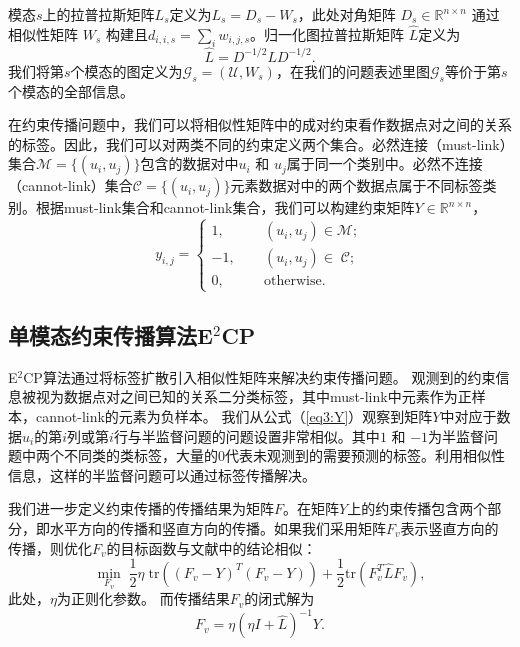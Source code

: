 模态$s$上的拉普拉斯矩阵$ {L}_s $定义为$ {L}_s={D}_s-{W}_s $，此处对角矩阵
$ {D}_s \in \mathbb{R}^{n\times n}$ 通过相似性矩阵 $ {W}_s$ 构建且$ d_{i,i,s} =\sum_i w_{i,j,s}$\cite{chung1997spectral}。归一化图拉普拉斯矩阵 $ \hat{{L}} $定义为
\begin{equation}
	\hat{{L}} = {D}^{-1/2}{LD}^{-1/2}.
\end{equation}
我们将第$s$个模态的图定义为$\mathcal{G}_s = (\mathcal{U},{W}_s)$，在我们的问题表述里图$\mathcal{G}_s$等价于第$s$个模态的全部信息。

在约束传播问题中，我们可以将相似性矩阵中的成对约束看作数据点对之间的关系的标签。因此，我们可以对两类不同的约束定义两个集合。必然连接（must-link）集合$ \mathcal{M} = \{(u_i,u_j)\} $包含的数据对中$ u_i $ 和 $ u_j $属于同一个类别中。必然不连接（cannot-link）集合$ \mathcal{C} = \{(u_i,u_j)\}$元素数据对中的两个数据点属于不同标签类别。根据must-link集合和cannot-link集合，我们可以构建约束矩阵$ {Y} \in  \mathbb{R}^{n\times n}$，
\begin{equation}
y_{i,j} = 
\begin{cases}
1, \qquad&(u_i,u_j)\in \mathcal{M};\\
-1, &(u_i,u_j)\in\; \mathcal{C};\\
0, &\text{otherwise}.
\end{cases}
\label{eq3:Y}
\end{equation}

\subsection{单模态约束传播算法E$^2$CP}
E$^2$CP算法通过将标签扩散引入相似性矩阵来解决约束传播问题。
观测到的约束信息被视为数据点对之间已知的关系二分类标签，其中must-link中元素作为正样本，cannot-link的元素为负样本。
我们从公式（\ref{eq3:Y}）观察到矩阵$Y$中对应于数据$u_i$的第$i$列或第$i$行与半监督问题的问题设置非常相似。其中$ 1 $ 和 $ -1 $为半监督问题中两个不同类的类标签，大量的$0$代表未观测到的需要预测的标签。利用相似性信息，这样的半监督问题可以通过标签传播\cite{zhou2004learning}解决。

我们进一步定义约束传播的传播结果为矩阵$F$。在矩阵$Y$上的约束传播包含两个部分，即水平方向的传播和竖直方向的传播。如果我们采用矩阵$F_v$表示竖直方向的传播，则优化$F_v$的目标函数与文献\parencite{zhou2004learning}中的结论相似：
\begin{equation}
	\mathop{\mathrm{min}}_{{F}_v}\;\frac{1}{2}\eta\;\mathrm{tr}(({F}_v-{Y})^T({F}_v-{Y}))+\frac{1}{2}\mathrm{tr}({F}_v^T\hat{{L}}{F}_v), 
\end{equation}
此处，$ \eta $为正则化参数。
而传播结果$F_v$的闭式解为
\begin{equation}
	{F}_v = \eta(\eta{I}+\hat{{L}})^{-1}{Y}.
\end{equation}

